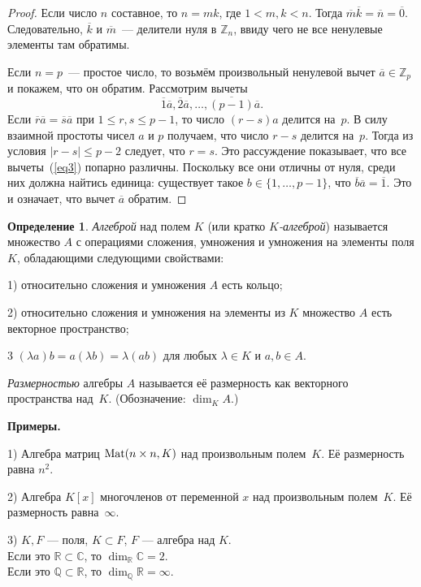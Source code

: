 \documentclass[a4paper,10pt]{amsart}
\def\Mat{{\rm Mat}}%
\def\CC{{\mathbb C}}%
\def\ZZ{{\mathbb Z}}%
\def\RR{{\mathbb R}}%
\def\QQ{{\mathbb Q}}%
\def\Mat{{\rm Mat}}
\theoremstyle{definition}
\newtheorem{definition}{Определение}
\theoremstyle{remark}
\begin{document}
\begin{proof}
Если число $n$ составное, то $n = m k$, где $1 < m, k < n$. Тогда
$\overline{m} \overline{k} = \overline{n} = \overline{0}$.
Следовательно, $\overline k$ и $\overline m$~--- делители нуля в
$\ZZ_n$, ввиду чего не все ненулевые элементы там обратимы.

Если $n = p$~--- простое число, то возьмём произвольный ненулевой
вычет $\overline{a} \in \ZZ_p$ и покажем, что он обратим. Рассмотрим
вычеты
\begin{equation} \label{eq3}
\overline{1} \overline{a}, \overline{2} \overline{a}, \ldots,
\overline{(p-1)} \overline{a}.
\end{equation}
Если $\overline{r} \overline{a} = \overline{s} \overline{a}$ при $1
\leqslant r,s \leqslant p-1$, то число $(r - s)a$ делится на~$p$. В
силу взаимной простоты чисел $a$ и $p$ получаем, что число $r - s$
делится на~$p$. Тогда из условия $|r-s| \leqslant p - 2$ следует,
что $r = s$. Это рассуждение показывает, что все вычеты~(\ref{eq3})
попарно различны. Поскольку все они отличны от нуля, среди них
должна найтись единица: существует такое $b \in \lbrace 1, \ldots,
p-1 \rbrace$, что $\overline{b} \overline{a}=\overline{1}$. Это и
означает, что вычет $\overline{a}$ обратим.
\end{proof}

\begin{definition}
{\it Алгеброй} над полем $K$ (или кратко \textit{$K$-алгеброй})
называется множество $A$ с операциями сложения, умножения и
умножения на элементы поля $K$, обладающими следующими свойствами:

1) относительно сложения и умножения $A$ есть кольцо;

2) относительно сложения и умножения на элементы из $K$ множество
$A$ есть векторное пространство;

3 $(\lambda a)b=a(\lambda b)=\lambda(ab)$ для любых $\lambda\in K$ и
$a,b\in A$.

{\it Размерностью} алгебры $A$ называется её размерность как
векторного пространства над~$K$. (Обозначение: $\dim_K A$.)
\end{definition}

\textbf{Примеры.}

1) Алгебра матриц $\Mat(n\times n, K)$ над
произвольным полем~$K$. Её размерность равна $n^2$.

2) Алгебра $K[x]$ многочленов от переменной $x$ над произвольным
полем~$K$. Её размерность равна~$\infty$.

3) $K, F$ --- поля, $K \subset F$, $F$ --- алгебра над $K$. \\
Если это $\RR \subset \CC$, то $\dim_\RR\CC = 2$.\\
Если это $\QQ \subset \RR$, то $\dim_\QQ\RR = \infty$.
\end{document}
